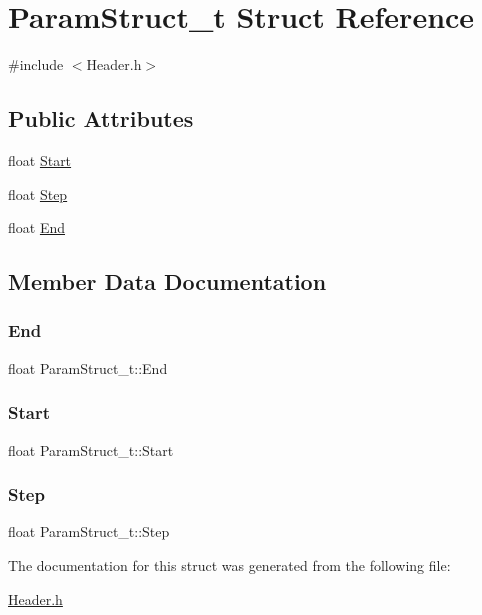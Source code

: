 \hypertarget{struct_param_struct__t}{}\section{Param\+Struct\+\_\+t Struct Reference}
\label{struct_param_struct__t}


{\ttfamily \#include $<$Header.\+h$>$}

\subsection*{Public Attributes}
\begin{DoxyCompactItemize}
\item 
float \hyperlink{struct_param_struct__t_ac7ae7804783ae133afeafc52d0c0d24f}{Start}
\item 
float \hyperlink{struct_param_struct__t_a62ac395aa92df486ec298627dc7ef49c}{Step}
\item 
float \hyperlink{struct_param_struct__t_a4fdaeac374f1f1e69be913a5f54ac3b8}{End}
\end{DoxyCompactItemize}


\subsection{Member Data Documentation}
\mbox{\label{struct_param_struct__t_a4fdaeac374f1f1e69be913a5f54ac3b8}} 
\subsubsection{\texorpdfstring{End}{End}}
{\footnotesize\ttfamily float Param\+Struct\+\_\+t\+::\+End}

\mbox{\label{struct_param_struct__t_ac7ae7804783ae133afeafc52d0c0d24f}} 
\subsubsection{\texorpdfstring{Start}{Start}}
{\footnotesize\ttfamily float Param\+Struct\+\_\+t\+::\+Start}

\mbox{\label{struct_param_struct__t_a62ac395aa92df486ec298627dc7ef49c}} 
\subsubsection{\texorpdfstring{Step}{Step}}
{\footnotesize\ttfamily float Param\+Struct\+\_\+t\+::\+Step}



The documentation for this struct was generated from the following file\+:\begin{DoxyCompactItemize}
\item 
\hyperlink{_header_8h}{Header.\+h}\end{DoxyCompactItemize}
